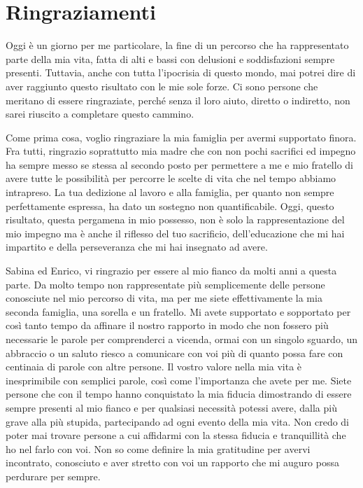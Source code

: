 \chapter*{Ringraziamenti}
\fancyhf{}

Oggi è un giorno per me particolare, la fine di un percorso che ha rappresentato parte della mia vita, fatta di alti e bassi con delusioni e soddisfazioni sempre presenti. Tuttavia, anche con tutta l'ipocrisia di questo mondo, mai potrei dire di aver raggiunto questo risultato con le mie sole forze. Ci sono persone che meritano di essere ringraziate, perché senza il loro aiuto, diretto o indiretto, non sarei riuscito a completare questo cammino.

Come prima cosa, voglio ringraziare la mia famiglia per avermi supportato finora. Fra tutti, ringrazio soprattutto mia madre che con non pochi sacrifici ed impegno ha sempre messo se stessa al secondo posto per permettere a me e mio fratello di avere tutte le possibilità per percorre le scelte di vita che nel tempo abbiamo intrapreso. La tua dedizione al lavoro e alla famiglia, per quanto non sempre perfettamente espressa, ha dato un sostegno non quantificabile. Oggi, questo risultato, questa pergamena in mio possesso, non è solo la rappresentazione del mio impegno ma è anche il riflesso del tuo sacrificio, dell'educazione che mi hai impartito e della perseveranza che mi hai insegnato ad avere.

Sabina ed Enrico, vi ringrazio per essere al mio fianco da molti anni a questa parte. Da molto tempo non rappresentate più semplicemente delle persone conosciute nel mio percorso di vita, ma per me siete effettivamente la mia seconda famiglia, una sorella e un fratello. Mi avete supportato e sopportato per così tanto tempo da affinare il nostro rapporto in modo che non fossero più necessarie le parole per comprenderci a vicenda, ormai con un singolo sguardo, un abbraccio o un saluto riesco a comunicare con voi più di quanto possa fare con centinaia di parole con altre persone. Il vostro valore nella mia vita è inesprimibile con semplici parole, così come l'importanza che avete per me. Siete persone che con il tempo hanno conquistato la mia fiducia dimostrando di essere sempre presenti al mio fianco e per qualsiasi necessità potessi avere, dalla più grave alla più stupida, partecipando ad ogni evento della mia vita. Non credo di poter mai trovare persone a cui affidarmi con la stessa fiducia e tranquillità che ho nel farlo con voi. Non so come definire la mia gratitudine per avervi incontrato, conosciuto e aver stretto con voi un rapporto che mi auguro possa perdurare per sempre.

